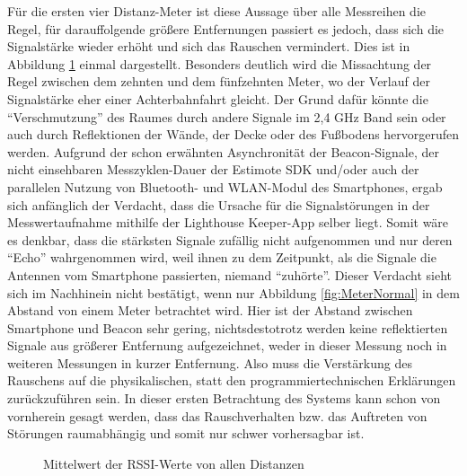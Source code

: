 Für die ersten vier Distanz-Meter ist diese Aussage über alle Messreihen die Regel, für darauffolgende größere Entfernungen passiert es jedoch, dass sich die Signalstärke wieder erhöht und sich das Rauschen vermindert. Dies ist in Abbildung  \ref{fig:MittelwertAlle} einmal dargestellt. Besonders deutlich wird die Missachtung der Regel zwischen dem zehnten und dem fünfzehnten Meter, wo der Verlauf der Signalstärke eher einer Achterbahnfahrt gleicht. Der Grund dafür könnte die "`Verschmutzung"' des Raumes durch andere Signale im 2,4 GHz Band sein oder auch durch Reflektionen der Wände, der Decke oder des Fußbodens hervorgerufen werden. Aufgrund der schon erwähnten Asynchronität der Beacon-Signale, der nicht einsehbaren Messzyklen-Dauer der Estimote SDK und/oder auch der parallelen Nutzung von Bluetooth- und WLAN-Modul des Smartphones, ergab sich anfänglich der Verdacht, dass die Ursache für die Signalstörungen in der Messwertaufnahme mithilfe der Lighthouse Keeper-App selber liegt. Somit wäre es denkbar, dass die stärksten Signale zufällig nicht aufgenommen und nur deren "`Echo"' wahrgenommen wird, weil ihnen zu dem Zeitpunkt, als die Signale die Antennen vom Smartphone passierten, niemand "`zuhörte"'. Dieser Verdacht sieht sich im Nachhinein nicht bestätigt, wenn nur Abbildung \ref{fig:MeterNormal} in dem Abstand von einem Meter betrachtet wird. Hier ist der Abstand zwischen Smartphone und Beacon sehr gering, nichtsdestotrotz werden keine reflektierten Signale aus größerer Entfernung aufgezeichnet, weder in dieser Messung noch in weiteren Messungen in kurzer Entfernung. Also muss die Verstärkung des Rauschens auf die physikalischen, statt den programmiertechnischen Erklärungen zurückzuführen sein. In dieser ersten Betrachtung des Systems kann schon von vornherein gesagt werden, dass das Rauschverhalten bzw. das Auftreten von Störungen raumabhängig und somit nur schwer vorhersagbar ist.
\begin{figure}[H] 
\centering
{}
\caption{Mittelwert der RSSI-Werte von allen Distanzen}
\label{fig:MittelwertAlle}
\end{figure}
